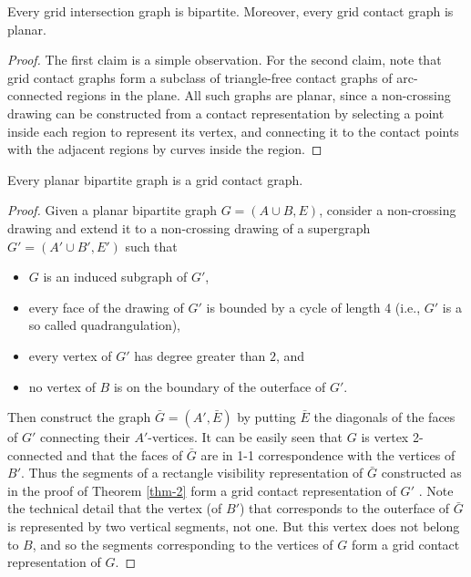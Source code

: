 \begin{prop}
	Every grid intersection graph is bipartite. Moreover, every grid contact graph is planar.
\end{prop}

\begin{proof}
	The first claim is a simple observation. For the second claim, note that grid contact graphs form a subclass of triangle-free contact graphs of arc-connected regions in the plane. All such graphs are planar, since a non-crossing drawing can be constructed from a contact representation by selecting a point inside each region to represent its vertex, and connecting it to the contact points with the adjacent regions by curves inside the region.
\end{proof}

\begin{thm}
	Every planar bipartite graph is a grid contact graph.
	\label{thm-3}
\end{thm}

\begin{proof}
	Given a planar bipartite graph $G = (A \cup B, E)$, consider a non-crossing drawing and extend it to a non-crossing drawing of a supergraph $G' = (A' \cup B' , E')$ such that
	
	\begin{itemize}
		\item $G$ is an induced subgraph of $G'$,
		\item every face of the drawing of $G'$ is bounded by a cycle of length 4 (i.e., $G'$ is a so called quadrangulation),
		\item every vertex of $G'$ has degree greater than $2$, and
		\item no vertex of $B$ is on the boundary of the outerface of $G'$. 
	\end{itemize}
	
	Then construct the graph $\bar{G} = (A', \bar{E})$ by putting $\bar{E}$ the diagonals of the faces of $G'$ connecting their $A'$-vertices. It can be easily seen that $G$ is vertex 2-connected and that the faces of $\bar{G}$ are in 1-1 correspondence with the vertices of $B'$. Thus the segments of a rectangle visibility representation of $\bar{G}$ constructed as in the proof of Theorem \ref{thm-2} form a grid contact representation of $G'$ . Note the technical detail that the vertex (of $B'$) that corresponds to the outerface of $\bar{G}$ is represented by two vertical segments, not one. But this vertex does not belong to $B$, and so the segments corresponding to the vertices of $G$ form a grid contact representation of $G$.
\end{proof}

